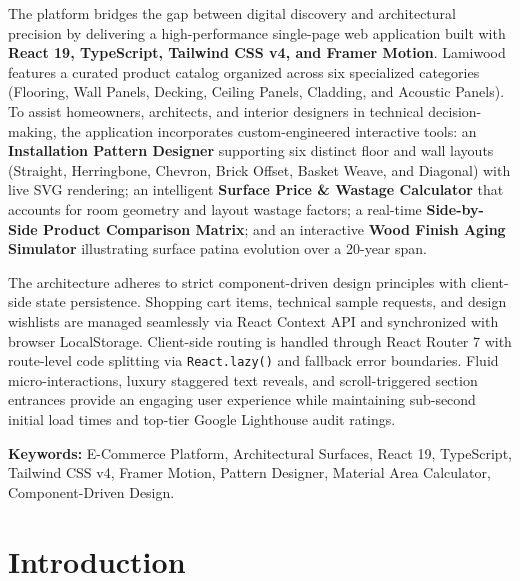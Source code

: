 \documentclass[12pt,a4paper]{report}
\begin{document}
The platform bridges the gap between digital discovery and architectural precision by delivering a high-performance single-page web application built with \textbf{React 19, TypeScript, Tailwind CSS v4, and Framer Motion}. Lamiwood features a curated product catalog organized across six specialized categories (Flooring, Wall Panels, Decking, Ceiling Panels, Cladding, and Acoustic Panels). To assist homeowners, architects, and interior designers in technical decision-making, the application incorporates custom-engineered interactive tools: an \textbf{Installation Pattern Designer} supporting six distinct floor and wall layouts (Straight, Herringbone, Chevron, Brick Offset, Basket Weave, and Diagonal) with live SVG rendering; an intelligent \textbf{Surface Price \& Wastage Calculator} that accounts for room geometry and layout wastage factors; a real-time \textbf{Side-by-Side Product Comparison Matrix}; and an interactive \textbf{Wood Finish Aging Simulator} illustrating surface patina evolution over a 20-year span.

The architecture adheres to strict component-driven design principles with client-side state persistence. Shopping cart items, technical sample requests, and design wishlists are managed seamlessly via React Context API and synchronized with browser LocalStorage. Client-side routing is handled through React Router 7 with route-level code splitting via \texttt{React.lazy()} and fallback error boundaries. Fluid micro-interactions, luxury staggered text reveals, and scroll-triggered section entrances provide an engaging user experience while maintaining sub-second initial load times and top-tier Google Lighthouse audit ratings.

\vspace{0.8cm}
\noindent\textbf{Keywords:} E-Commerce Platform, Architectural Surfaces, React 19, TypeScript, Tailwind CSS v4, Framer Motion, Pattern Designer, Material Area Calculator, Component-Driven Design.

\newpage

\tableofcontents
\newpage


\chapter{Introduction}
\end{document}
